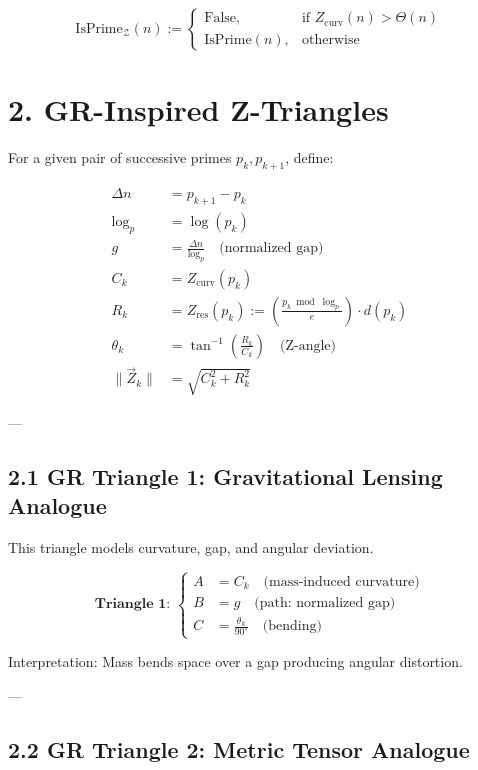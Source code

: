 \documentclass{article}
\begin{document}
\[
\text{IsPrime}_{\mathcal{Z}}(n) := 
\begin{cases}
\text{False}, & \text{if } Z_{\text{curv}}(n) > \Theta(n) \\
\text{IsPrime}(n), & \text{otherwise}
\end{cases}
\]

\section*{2. GR-Inspired Z-Triangles}

For a given pair of successive primes \( p_k, p_{k+1} \), define:

\begin{align*}
    \Delta n &= p_{k+1} - p_k \\
    \log_p &= \log(p_k) \\
    g &= \frac{\Delta n}{\log_p} \quad \text{(normalized gap)} \\
    C_k &= Z_{\text{curv}}(p_k) \\
    R_k &= Z_{\text{res}}(p_k) := \left( \frac{p_k \bmod \log_p}{e} \right) \cdot d(p_k) \\
    \theta_k &= \tan^{-1}\left( \frac{R_k}{C_k} \right) \quad \text{(Z-angle)} \\
    \| \vec{Z}_k \| &= \sqrt{C_k^2 + R_k^2}
\end{align*}

---

\subsection*{2.1 GR Triangle 1: Gravitational Lensing Analogue}

This triangle models curvature, gap, and angular deviation.

\[
\boxed{
\textbf{Triangle 1: } 
\left\{
\begin{aligned}
A &= C_k \quad \text{(mass-induced curvature)} \\
B &= g \quad \text{(path: normalized gap)} \\
C &= \frac{\theta_k}{90^\circ} \quad \text{(bending)}
\end{aligned}
\right.
}
\]

Interpretation: Mass bends space over a gap producing angular distortion.

---

\subsection*{2.2 GR Triangle 2: Metric Tensor Analogue}
\end{document}
